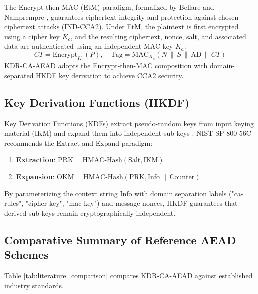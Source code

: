 The Encrypt-then-MAC (EtM) paradigm, formalized by Bellare and Namprempre \cite{bellare2000authenticated}, guarantees ciphertext integrity and protection against chosen-ciphertext attacks (IND-CCA2). Under EtM, the plaintext is first encrypted using a cipher key $K_c$, and the resulting ciphertext, nonce, salt, and associated data are authenticated using an independent MAC key $K_a$:
\begin{equation}
CT = \text{Encrypt}_{K_c}(P), \quad \text{Tag} = \text{MAC}_{K_a}(N \,\|\, S \,\|\, \text{AD} \,\|\, CT)
\label{eq:etm_generic}
\end{equation}
KDR-CA-AEAD adopts the Encrypt-then-MAC composition with domain-separated HKDF key derivation to achieve CCA2 security.

\subsection{Key Derivation Functions (HKDF)}
\label{subsec:hkdf_background}
Key Derivation Functions (KDFs) extract pseudo-random keys from input keying material (IKM) and expand them into independent sub-keys \cite{rfc5869}. NIST SP 800-56C \cite{nist2020sp80056c} recommends the Extract-and-Expand paradigm:
\begin{enumerate}
    \item \textbf{Extraction}: $\text{PRK} = \text{HMAC-Hash}(\text{Salt}, \text{IKM})$
    \item \textbf{Expansion}: $\text{OKM} = \text{HMAC-Hash}(\text{PRK}, \text{Info} \,\|\, \text{Counter})$
\end{enumerate}
By parameterizing the context string $\text{Info}$ with domain separation labels ("ca-rules", "cipher-key", "mac-key") and message nonces, HKDF guarantees that derived sub-keys remain cryptographically independent.

\subsection{Comparative Summary of Reference AEAD Schemes}
\label{subsec:comparative_summary}
Table \ref{tab:literature_comparison} compares KDR-CA-AEAD against established industry standards.

